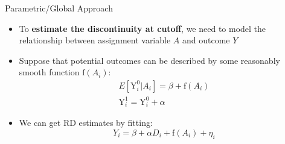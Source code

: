\documentclass[hyperref={pdfpagelabels=false}]{beamer}
\begin{document}
\begin{frame}{Parametric/Global Approach}{}
	\begin{itemize}
		\item To \textbf{estimate the discontinuity at cutoff}, we need to model the relationship between assignment variable $A$ and outcome $Y$
		\vspace{0.2cm}
		\item Suppose that potential outcomes can be described by some reasonably smooth function $\mathrm{f}(A_i)$:
		\begin{align*}
		E[\mathrm{Y}^{0}_{i}|A_i]=\beta+ \mathrm{f}(A_i) \\
		\mathrm{Y}^{1}_{i} = \mathrm{Y}^{0}_{i}+\alpha
		\end{align*}
		
		\item We can get RD estimates by fitting:
		\begin{equation*}
		Y_i=\beta +\alpha D_i+\mathrm{f}(A_i)+\eta_i
		\end{equation*}
		
	\end{itemize}
\end{frame}
\end{document}
